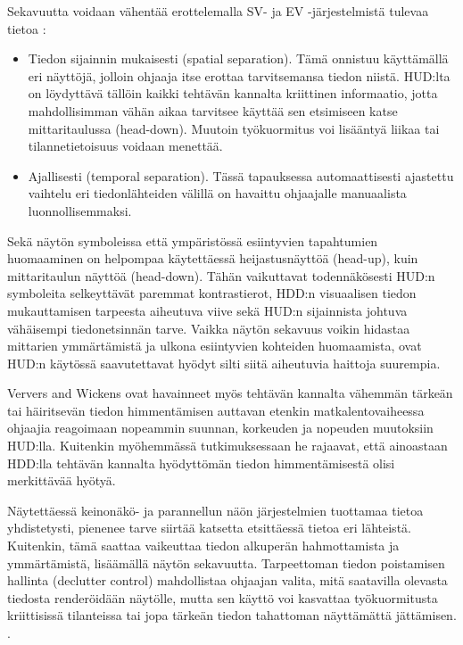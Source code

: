 \documentclass[utf8,bachelor,manualbib]{gradu3}
\begin{document}
Sekavuutta voidaan vähentää erottelemalla SV- ja EV -järjestelmistä tulevaa tietoa \citep{baileyym2007}:

\begin{itemize}
\item Tiedon sijainnin mukaisesti (spatial separation).
Tämä onnistuu käyttämällä eri näyttöjä, jolloin ohjaaja itse erottaa tarvitsemansa tiedon niistä. HUD:lta on löydyttävä tällöin kaikki tehtävän kannalta kriittinen informaatio, jotta mahdollisimman vähän aikaa  tarvitsee käyttää sen etsimiseen katse mittaritaulussa (head-down). Muutoin työkuormitus voi lisääntyä liikaa tai tilannetietoisuus voidaan menettää.
\item Ajallisesti (temporal separation).
Tässä tapauksessa automaattisesti ajastettu vaihtelu eri tiedonlähteiden välillä on havaittu ohjaajalle manuaalista luonnollisemmaksi.
\end{itemize}

Sekä näytön symboleissa että ympäristössä esiintyvien tapahtumien huomaaminen on helpompaa käytettäessä heijastusnäyttöä (head-up), kuin mittaritaulun näyttöä (head-down). Tähän vaikuttavat todennäkösesti HUD:n symboleita selkeyttävät paremmat kontrastierot, HDD:n visuaalisen tiedon mukauttamisen tarpeesta aiheutuva viive sekä HUD:n sijainnista johtuva vähäisempi tiedonetsinnän tarve. Vaikka näytön sekavuus voikin hidastaa mittarien ymmärtämistä ja ulkona esiintyvien kohteiden huomaamista, ovat HUD:n käytössä saavutettavat hyödyt silti siitä aiheutuvia haittoja suurempia. \citep{ververswickens1998}

Ververs and Wickens \citeyearpar{ververswickens1996} ovat havainneet myös tehtävän kannalta vähemmän tärkeän tai häiritsevän tiedon himmentämisen auttavan etenkin matkalentovaiheessa ohjaajia reagoimaan nopeammin suunnan, korkeuden ja nopeuden muutoksiin HUD:lla. Kuitenkin myöhemmässä tutkimuksessaan \citeyearpar{ververswickens1998} he rajaavat, että ainoastaan HDD:lla tehtävän kannalta hyödyttömän tiedon himmentämisestä olisi merkittävää hyötyä.

Näytettäessä keinonäkö- ja parannellun näön järjestelmien tuottamaa tietoa yhdistetysti, pienenee tarve siirtää katsetta etsittäessä tietoa eri lähteistä. Kuitenkin, tämä saattaa vaikeuttaa tiedon alkuperän hahmottamista ja ymmärtämistä, lisäämällä näytön sekavuutta. Tarpeettoman tiedon poistamisen hallinta (declutter control) mahdollistaa ohjaajan valita, mitä saatavilla olevasta tiedosta renderöidään näytölle, mutta sen käyttö voi kasvattaa työkuormitusta kriittisissä tilanteissa tai jopa tärkeän tiedon tahattoman näyttämättä jättämisen. \citep{baileyym2007}.
\end{document}
